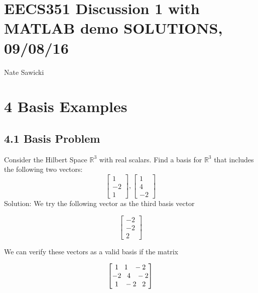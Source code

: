 \documentclass[11pt]{article}
\begin{document}
\section*{EECS351 Discussion 1 with MATLAB demo SOLUTIONS, 09/08/16}
Nate Sawicki

\section*{4 \hspace{3mm} Basis Examples}

\subsection*{4.1 \hspace{3mm} Basis Problem}

Consider the Hilbert Space $\mathbb{R}^3$ with real scalars. Find a basis for $\mathbb{R}^3$  that includes the following two vectors:
\[
\begin{bmatrix}
   1        \\
    -2      \\
    1      
\end{bmatrix}
,
\begin{bmatrix}
    1  \\
    4 \\
    -2 
\end{bmatrix}
\]
Solution:\newline
We try the following vector as the third basis vector
\begin{center}
\[
\begin{bmatrix}
   -2        \\
    -2      \\
    2     
\end{bmatrix}
\]


\end{center}

\vspace{3mm}
We can verify these vectors as a valid basis if the matrix

\begin{center}
\[
\begin{bmatrix}
   1  \hspace{3mm} 1 \hspace{ 3mm} -2      \\
   -2  \hspace{3mm} 4 \hspace{ 3mm} -2  \\
    1  \hspace{3mm} -2 \hspace{ 3mm} 2   
\end{bmatrix}
\]
\end{center}
\end{document}
